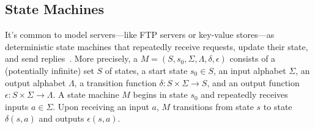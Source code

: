 
\subsection{State Machines}
It's common to model servers---like FTP servers or key-value stores---as
deterministic state machines that repeatedly receive requests, update their
state, and send replies~\cite{schneider1990implementing, lamport1998part}. More
precisely, a  $M = (S, s_0, \Sigma,
\Lambda, \delta, \epsilon)$ consists of
  a (potentially infinite) set $S$ of states,
  a start state $s_0 \in S$,
  an input alphabet $\Sigma$,
  an output alphabet $\Lambda$,
  a transition function $\delta: S \times \Sigma \to S$, and
  an output function $\epsilon: S \times \Sigma \to \Lambda$.
A state machine $M$ begins in state $s_0$ and repeatedly receives inputs $a \in
\Sigma$. Upon receiving an input $a$, $M$ transitions from state $s$ to state
$\delta(s, a)$ and outputs $\epsilon(s, a)$.

